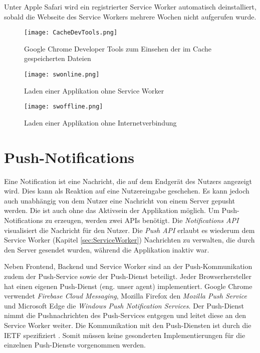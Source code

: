 Unter Apple Safari wird ein registrierter Service Worker automatisch deinstalliert, sobald die Webseite des Service Workers mehrere Wochen nicht aufgerufen wurde. 


\begin{figure}[!htb]
    \centering
    \texttt{[image: CacheDevTools.png]}
    \caption{Google Chrome Developer Tools zum Einsehen der im Cache gespeicherten Dateien}
    \label{img:CacheDevTools}
\end{figure}

\begin{figure}[!htb]
    \centering
    \texttt{[image: swonline.png]}
    \caption{Laden einer Applikation ohne Service Worker}
    \label{img:swonline}
\end{figure}

\begin{figure}[!htb]
    \centering
    \texttt{[image: swoffline.png]}
    \caption{Laden einer Applikation ohne Internetverbindung}
    \label{img:swoffline}
\end{figure}


\clearpage
\section{Push-Notifications}

Eine Notification ist eine Nachricht, die auf dem Endgerät des Nutzers angezeigt wird. Dies kann als Reaktion auf eine Nutzereingabe geschehen. Es kann jedoch auch unabhängig von dem Nutzer eine Nachricht von einem Server \glqq gepusht\grqq{} werden. Die ist auch ohne das Aktivsein der Applikation möglich.  Um Push-Notifications zu erzeugen, werden zwei APIs benötigt. Die \textit{Notifications API} visualisiert die Nachricht für den Nutzer. Die \textit{Push API} erlaubt es wiederum dem Service Worker (Kapitel \ref{sec:ServiceWorker}) Nachrichten zu verwalten, die durch den Server gesendet wurden, während die Applikation inaktiv war. 

Neben Frontend, Backend und Service Worker sind an der Push-Kommunikation zudem der Push-Service sowie der Push-Dienst beteiligt. Jeder Browserhersteller hat einen eigenen Push-Dienst (eng. unser agent) implementiert. Google Chrome verwendet \textit{Firebase Cloud Messaging}, Mozilla Firefox den \textit{Mozilla Push Service} und Microsoft Edge die \textit{Windows Push Notification Services}. Der Push-Dienst nimmt die Pushnachrichten des Push-Services entgegen und leitet diese an den Service Worker weiter. Die Kommunikation mit den Push-Diensten ist durch die \ac{IETF} spezifiziert \cite{rfc8030}. Somit müssen keine gesonderten Implementierungen für die einzelnen Push-Dienste vorgenommen werden. 

